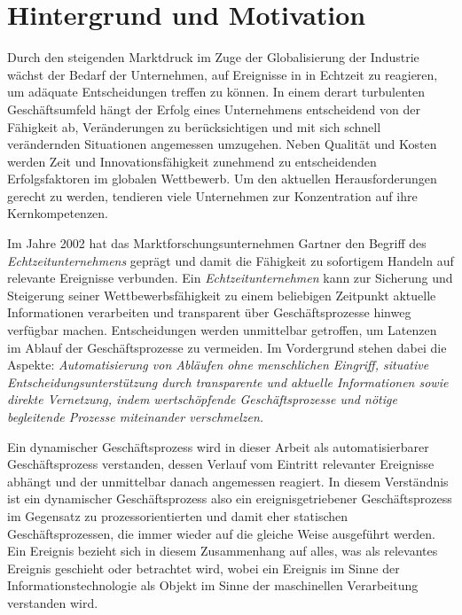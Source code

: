 \section{Hintergrund und Motivation}\label{sec:Hintergrund und Motivation}
Durch den steigenden Marktdruck im Zuge der Globalisierung der Industrie wächst der Bedarf der Unternehmen, auf Ereignisse in  in Echtzeit zu reagieren, um adäquate Entscheidungen treffen zu können. 
In einem derart turbulenten Geschäftsumfeld hängt der Erfolg eines Unternehmens entscheidend von der Fähigkeit ab, Veränderungen zu berücksichtigen und mit sich schnell verändernden Situationen angemessen umzugehen.
\cite{Kuhlin.2005}
Neben Qualität und Kosten werden Zeit und Innovationsfähigkeit zunehmend zu entscheidenden Erfolgsfaktoren im globalen Wettbewerb. Um den aktuellen Herausforderungen gerecht zu werden, tendieren viele Unternehmen zur Konzentration auf ihre Kernkompetenzen.
\cite{Grauer.2019}

Im Jahre 2002 hat das Marktforschungsunternehmen Gartner den Begriff des \textit{Echtzeitunternehmens} geprägt und damit die Fähigkeit zu sofortigem Handeln auf relevante Ereignisse verbunden. 
Ein \textit{Echtzeitunternehmen} kann zur Sicherung und Steigerung seiner Wettbewerbsfähigkeit zu einem beliebigen Zeitpunkt aktuelle Informationen verarbeiten und transparent über Geschäftsprozesse hinweg verfügbar machen. Entscheidungen werden unmittelbar getroffen, um Latenzen im Ablauf der Geschäftsprozesse zu vermeiden.  
\cite{Bruns.2015}
Im Vordergrund stehen dabei die Aspekte: \textit{Automatisierung von Abläufen ohne menschlichen Eingriff, situative Entscheidungsunterstützung durch transparente und aktuelle Informationen sowie direkte Vernetzung, indem wertschöpfende Geschäftsprozesse und nötige begleitende Prozesse miteinander verschmelzen.}
\cite{Grauer.2019}

Ein dynamischer Geschäftsprozess wird in dieser Arbeit als automatisierbarer Geschäftsprozess verstanden, dessen Verlauf vom Eintritt relevanter Ereignisse abhängt und der unmittelbar danach angemessen reagiert.
\cite{Vidackovic.2014}
In diesem Verständnis ist ein dynamischer Geschäftsprozess also ein ereignisgetriebener Geschäftsprozess im Gegensatz zu prozessorientierten und damit eher statischen Geschäftsprozessen, die immer wieder auf die gleiche Weise ausgeführt werden. Ein Ereignis bezieht sich in diesem Zusammenhang auf alles, was als relevantes Ereignis geschieht oder betrachtet wird, wobei ein Ereignis im Sinne der Informationstechnologie als Objekt im Sinne der maschinellen Verarbeitung verstanden wird.
\cite{Krumeich.}

